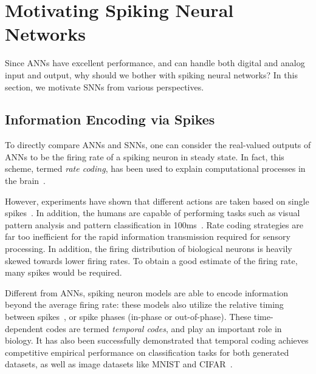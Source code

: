 \documentclass[fyp]{socreport}
\begin{document}
\section{Motivating Spiking Neural Networks\label{sec:motiv-spik-neur}}

Since ANNs have excellent performance, and can handle both digital and analog
input and output, why should we bother with spiking neural networks? In this
section, we motivate SNNs from various perspectives.

\subsection{Information Encoding via Spikes}

To directly compare ANNs and SNNs, one can consider the real-valued outputs of
ANNs to be the firing rate of a spiking neuron in steady state. In fact, this
scheme, termed \emph{rate coding}, has been used to explain computational
processes in the brain~\cite{pfeiffer2018deep}.

However, experiments have shown that different actions are taken based on single
spikes~\cite{stemmler96_singl_spike_suffic}. In addition, the humans are capable
of performing tasks such as visual pattern analysis and pattern classification
in 100ms~\cite{thorpe2001spike}. Rate coding strategies are far too inefficient
for the rapid information transmission required for sensory processing. In
addition, the firing distribution of biological neurons is heavily skewed
towards lower firing rates. To obtain a good estimate of the firing rate, many
spikes would be required.

Different from ANNs, spiking neuron models are able to encode information beyond
the average firing rate: these models also utilize the relative timing between
spikes~\cite{guetig14_to_spike_or_when_to_spike}, or spike phases (in-phase or
out-of-phase). These time-dependent codes are termed \emph{temporal codes}, and
play an important role in biology. It has also been successfully demonstrated
that temporal coding achieves competitive empirical performance on
classification tasks for both generated datasets, as well as image datasets like
MNIST and CIFAR~\cite{comsa19_tempor_codin_spikin_neural_networ}.
\end{document}

